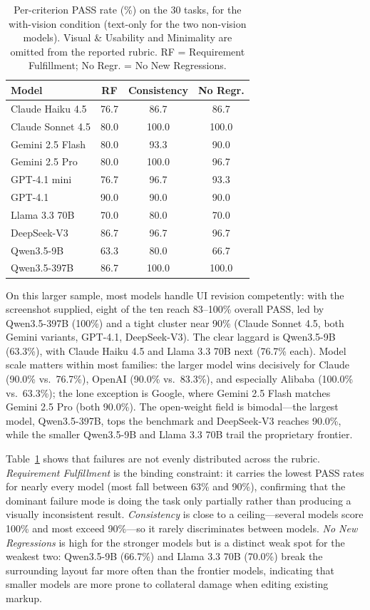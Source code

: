 \documentclass[sigconf,nonacm]{acmart}
\begin{document}
\begin{table}[t]
\centering
\small
\caption{Per-criterion PASS rate (\%) on the 30 tasks, for the with-vision condition (text-only for the two non-vision models). Visual \& Usability and Minimality are omitted from the reported rubric. RF = Requirement Fulfillment; No Regr. = No New Regressions.}
\label{tab:models_criteria}
\begin{tabular}{lccc}
\toprule
\textbf{Model} & \textbf{RF} & \textbf{Consistency} & \textbf{No Regr.} \\
\midrule
Claude Haiku 4.5   & 76.7 & 86.7  & 86.7 \\
Claude Sonnet 4.5  & 80.0 & 100.0 & 100.0 \\
Gemini 2.5 Flash   & 80.0 & 93.3  & 90.0 \\
Gemini 2.5 Pro     & 80.0 & 100.0 & 96.7 \\
GPT-4.1 mini       & 76.7 & 96.7  & 93.3 \\
GPT-4.1            & 90.0 & 90.0  & 90.0 \\
Llama 3.3 70B      & 70.0 & 80.0  & 70.0 \\
DeepSeek-V3        & 86.7 & 96.7  & 96.7 \\
Qwen3.5-9B         & 63.3 & 80.0  & 66.7 \\
Qwen3.5-397B       & 86.7 & 100.0 & 100.0 \\
\bottomrule
\end{tabular}
\end{table}

On this larger sample, most models handle UI revision competently: with the screenshot supplied, eight of the ten reach 83--100\% overall PASS, led by Qwen3.5-397B (100\%) and a tight cluster near 90\% (Claude Sonnet 4.5, both Gemini variants, GPT-4.1, DeepSeek-V3). The clear laggard is Qwen3.5-9B (63.3\%), with Claude Haiku 4.5 and Llama 3.3 70B next (76.7\% each). Model scale matters within most families: the larger model wins decisively for Claude (90.0\% vs.\ 76.7\%), OpenAI (90.0\% vs.\ 83.3\%), and especially Alibaba (100.0\% vs.\ 63.3\%); the lone exception is Google, where Gemini 2.5 Flash matches Gemini 2.5 Pro (both 90.0\%). The open-weight field is bimodal—the largest model, Qwen3.5-397B, tops the benchmark and DeepSeek-V3 reaches 90.0\%, while the smaller Qwen3.5-9B and Llama 3.3 70B trail the proprietary frontier.

Table~\ref{tab:models_criteria} shows that failures are not evenly distributed across the rubric. \emph{Requirement Fulfillment} is the binding constraint: it carries the lowest PASS rates for nearly every model (most fall between 63\% and 90\%), confirming that the dominant failure mode is doing the task only partially rather than producing a visually inconsistent result. \emph{Consistency} is close to a ceiling—several models score 100\% and most exceed 90\%—so it rarely discriminates between models. \emph{No New Regressions} is high for the stronger models but is a distinct weak spot for the weakest two: Qwen3.5-9B (66.7\%) and Llama 3.3 70B (70.0\%) break the surrounding layout far more often than the frontier models, indicating that smaller models are more prone to collateral damage when editing existing markup.
\end{document}
